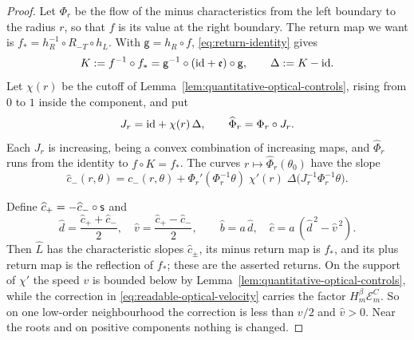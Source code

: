 \begin{proof}
Let $\Phi_r$ be the flow of the minus characteristics from the left
boundary to the radius $r$, so that $f$ is its value at the right
boundary. The return map we want is
$f_*=h_R^{-1}\circ R_{-T}\circ h_L$. With $\mathsf g=h_R\circ f$,
\eqref{eq:return-identity} gives
\[
 K:=f^{-1}\circ f_*=\mathsf g^{-1}\circ(\mathrm{id}+\mathfrak e)\circ\mathsf g,
 \qquad \Delta:=K-\mathrm{id} .
\]
Let $\chi(r)$ be the cutoff of
Lemma~\ref{lem:quantitative-optical-controls}, rising from $0$ to $1$
inside the component, and put
\[
 J_r=\mathrm{id}+\chi(r)\,\Delta,\qquad \widehat\Phi_r=\Phi_r\circ J_r .
\]
Each $J_r$ is increasing, being a convex combination of increasing
maps, and $\widehat\Phi_r$ runs from the identity to $f\circ K=f_*$.
The curves $r\mapsto\widehat\Phi_r(\theta_0)$ have the slope
\begin{equation}\label{eq:readable-optical-velocity}
 \widehat c_-(r,\theta)=c_-(r,\theta)+
 \Phi_r'(\Phi_r^{-1}\theta)\;\chi'(r)\;
                   \Delta\bigl(J_r^{-1}\Phi_r^{-1}\theta\bigr).
\end{equation}

Define $\widehat c_+=-\widehat c_-\circ\mathsf s$ and
\[
 \widehat d=\frac{\widehat c_++\widehat c_-}2,\quad
 \widehat v=\frac{\widehat c_+-\widehat c_-}2,\qquad
 \widehat b=a\,\widehat d,\quad
 \widehat c=a\,(\widehat d^{\,2}-\widehat v^{\,2}).
\]
Then $\widehat L$ has the characteristic slopes $\widehat c_\pm$, its
minus return map is $f_*$, and its plus return map is the reflection
of $f_*$; these are the asserted returns. On the support of $\chi'$
the speed $v$ is bounded below by
Lemma~\ref{lem:quantitative-optical-controls}, while the correction
in \eqref{eq:readable-optical-velocity} carries the factor
$H_m^\beta\mathcal E_m^C$. So on one low-order neighbourhood the
correction is less than $v/2$ and $\widehat v>0$. Near the roots and
on positive components nothing is changed.


\end{proof}
